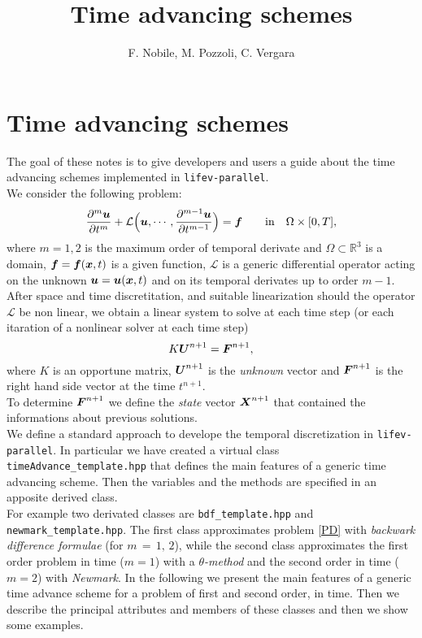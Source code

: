 \documentclass[english,a4paper]{article}
\title{Time advancing schemes}
\author{F. Nobile, M. Pozzoli, C. Vergara}
\date{}
\newcommand{\Xbf}{\text{\mbox{\boldmath $X$}}}
\newcommand{\ubf}{\text{\mbox{\boldmath $u$}}}
\newcommand{\xbf}{\text{\mbox{\boldmath $x$}}}
\newcommand{\Ubf}{\text{\mbox{\boldmath $U$}}}
\newcommand{\fbf}{\text{\mbox{\boldmath $f$}}}
\newcommand{\Fbf}{\text{\mbox{\boldmath $F$}}}
\newcommand{\xx}{\boldsymbol}
\begin{document}
\maketitle




\pagestyle{plain}

\tableofcontents

\newpage


\section{Time advancing schemes}
The goal of these notes is to give developers and users a guide about
the time advancing schemes implemented in \verb"lifev-parallel".\\
We consider the following problem:
 \begin{equation}\label{PD}
 \displaystyle\frac{\partial^m \ubf}{\partial t^m}+\mathcal{L} \Big(\ubf,\cdots,\displaystyle\frac{\partial^{m-1} \ubf}{\partial t^{m-1}} \Big)= \fbf\qquad \textrm{in}\quad\Omega\times [0, T],
 \end{equation}
where $m = 1, 2$ is the maximum order of temporal derivate and
$\Omega\subset \mathbb{R}^3$  is a domain,
$\fbf=\fbf(\xbf,t)$ is a given function,  $\mathcal{L}$  is a generic differential
operator acting on the unknown  $\ubf=\ubf(\xbf,t)$ and on   its temporal
derivates up to order $m-1$.\\
After space and time discretitation, and suitable linearization should
the operator $\mathcal{L}$ be non linear, we obtain a linear system to solve at
each time step (or each itaration of a nonlinear solver at each time step)
 \begin{equation}\label{modello}
 K \xx U^{n+1}=\Fbf^{n+1},
 \end{equation}
where $K$  is an opportune matrix, $\Ubf^{n+1}$ is the {\sl unknown} vector
 and $\Fbf^{n+1}$ is the right hand side vector at the time
 $t^{n+1}$. \\
To determine $\Fbf^{n+1}$ we define the {\sl state} vector $\Xbf^{n+1}$ that contained the
informations about previous solutions.\\
 We define a standard approach to develope the temporal discretization
 in \verb"lifev-parallel". In particular we have created a virtual class
 \verb"timeAdvance_template.hpp" that defines the main features of
 a generic time advancing scheme. Then  the  variables and the methods  are specified in an apposite derived class.\\
For example two derivated classes are \verb"bdf_template.hpp" and
\verb"newmark_template.hpp". The first class approximates  problem  \eqref{PD} with  {\sl backwark
  difference formulae} (for $m\,=\,1,\,2$), while the second class approximates the first order problem in time ($m=1$) with a {\sl$\theta$-method} and the second order in
time ($m=2$) with {\sl Newmark}.
In the following we present the main features of a generic time
advance scheme for a problem of first  and  second  order, in
time.
Then we describe the principal attributes and members of these classes
and then we show some examples.
\end{document}
